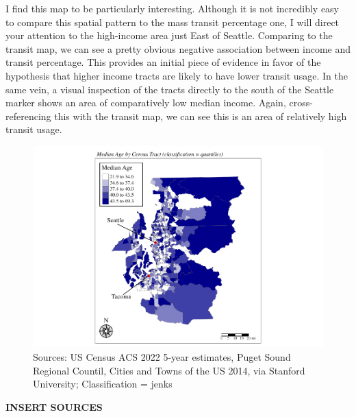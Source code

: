\documentclass[
]{article}
\begin{document}
I find this map to be particularly interesting. Although it is not
incredibly easy to compare this spatial pattern to the mass transit
percentage one, I will direct your attention to the high-income area
just East of Seattle. Comparing to the transit map, we can see a pretty
obvious negative association between income and transit percentage. This
provides an initial piece of evidence in favor of the hypothesis that
higher income tracts are likely to have lower transit usage. In the same
vein, a visual inspection of the tracts directly to the south of the
Seattle marker shows an area of comparatively low median income. Again,
cross-referencing this with the transit map, we can see this is an area
of relatively high transit usage.

\begin{figure}
\centering
\includegraphics{transit-hotspots-PSRC_files/figure-latex/unnamed-chunk-7-1.pdf}
\caption{Sources: US Census ACS 2022 5-year estimates, Puget Sound
Regional Countil, Cities and Towns of the US 2014, via Stanford
University; Classification = jenks}
\end{figure}

\textbf{INSERT SOURCES}
\end{document}
